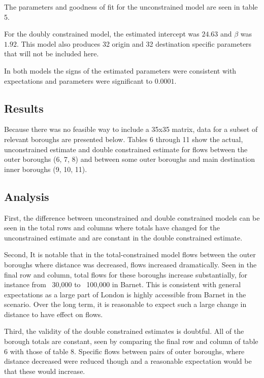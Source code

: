 \documentclass[11pt]{article} %
\begin{document}
The parameters and goodness of fit for the unconstrained model are seen in table 5.

For the doubly constrained model, the estimated intercept was $24.63$ and $\beta$ was $1.92$. This model also produces 32 origin and 32 destination specific parameters that will not be included here. 

In both models the signs of the estimated parameters were consistent with expectations and parameters were significant to $0.0001$.

\subsection{Results}

Because there was no feasible way to include a 35x35 matrix, data for a subset of relevant boroughs are presented below. Tables 6 through 11 show the actual, unconstrained estimate and double constrained estimate for flows between the outer boroughs (6, 7, 8) and between some outer boroughs and main destination inner boroughs (9, 10,  11). 



\subsection{Analysis}

First, the difference between unconstrained and double constrained models can be seen in the total rows and columns where totals have changed for the unconstrained estimate and are constant in the double constrained estimate. 

Second, It is notable that in the total-constrained model flows between the outer boroughs where distance was decreased, flows increased dramatically. Seen in the final row and column, total flows for these boroughs increase substantially, for instance from ~30,000 to ~100,000 in Barnet. This is consistent with general expectations as a large part of London is highly accessible from Barnet in the scenario. Over the long term, it is reasonable to expect such a large change in distance to have effect on flows. 

Third, the validity of the double constrained estimates is doubtful. All of the borough totals are constant, seen by comparing the final row and column of table 6 with those of table 8. Specific flows between pairs of outer boroughs, where distance decreased were reduced though and a reasonable expectation would be that these would increase. 
\end{document}
